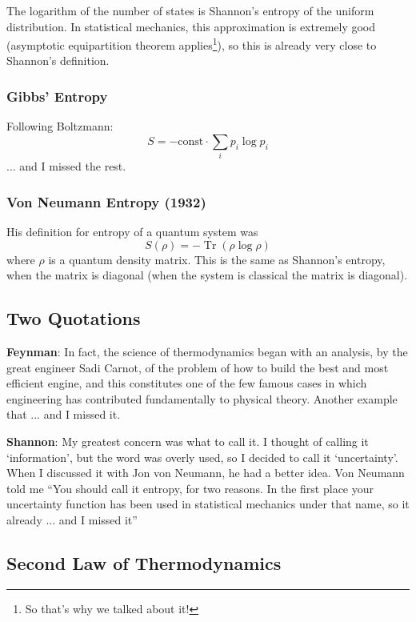 \documentclass{article}
\begin{document}
The logarithm of the number of states is Shannon's entropy of the uniform distribution. In statistical mechanics, this approximation is extremely good (asymptotic equipartition theorem applies\footnote{So that's why we talked about it!}), so this is already very close to Shannon's definition.

\subsubsection{Gibbs' Entropy}

Following Boltzmann:
\[
S= -\text{const}\cdot \sum_i p_i\log p_i
\]
... and I missed the rest.

\subsubsection{Von Neumann Entropy (1932)}

His definition for entropy of a quantum system was 
\[
S(\rho) = -\operatorname{Tr}\left(\rho \log \rho\right)
\]
where $\rho$ is a quantum density matrix. This is the same as Shannon's entropy, when the matrix is diagonal (when the system is classical the matrix is diagonal).

\subsection{Two Quotations}

\textbf{Feynman}: In fact, the science of thermodynamics began with an analysis, by the great engineer Sadi Carnot, of the problem of how to build the best and most efficient engine, and this constitutes one of the few famous cases in which engineering has contributed fundamentally to physical theory. Another example that ... and I missed it.

\textbf{Shannon}: My greatest concern was what to call it. I thought of calling it `information', but the word was overly used, so I decided to call it `uncertainty'. When I discussed it with Jon von Neumann, he had a better idea. Von Neumann told me ``You should call it entropy, for two reasons. In the first place your uncertainty function has been used in statistical mechanics under that name, so it already ... and I missed it''

\subsection{Second Law of Thermodynamics}
\end{document}
